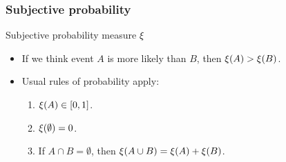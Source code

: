   \begin{frame}
    \frametitle{Subjective probability}
    \begin{block}{Subjective probability measure $\xi$}
      \begin{itemize}
      \item If we think event $A$ is more likely than $B$, then $\xi(A) > \xi(B)$.
      \item Usual rules of probability apply:
        \begin{enumerate}
        \item $\xi(A) \in [0,1]$.
        \item $\xi(\emptyset) = 0$.
        \item If $A \cap B = \emptyset$, then $\xi(A \cup B) = \xi(A) + \xi(B)$.
        \end{enumerate}
      \end{itemize}
    \end{block}
  \end{frame}


